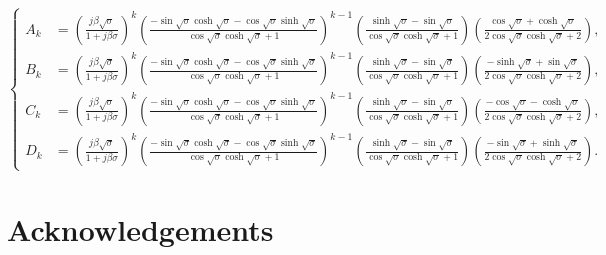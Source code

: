 \documentclass{article}
\begin{document}
\begin{equation*}
    \left\{\begin{aligned}
        A_{k} &= \left( \frac{j \beta \sqrt{\sigma }}{1+j \beta \sigma } \right)^{k} \left( \frac{ -\sin\sqrt{\sigma} \cosh\sqrt{\sigma} - \cos\sqrt{\sigma} \sinh\sqrt{\sigma} }{ \cos\sqrt{\sigma }\cosh\sqrt{\sigma }+1 } \right)^{k-1} \left( \frac{\sinh\sqrt{\sigma }-\sin\sqrt{\sigma }}{\cos\sqrt{\sigma } \cosh\sqrt{\sigma }+1} \right) \left(\frac{\cos\sqrt{\sigma }+\cosh\sqrt{\sigma }}{2 \cos\sqrt{\sigma }\cosh\sqrt{\sigma }+2} \right), \\
        B_{k} &= \left( \frac{j \beta \sqrt{\sigma }}{1+j \beta \sigma } \right)^{k}  \left( \frac{ -\sin\sqrt{\sigma} \cosh\sqrt{\sigma} - \cos\sqrt{\sigma} \sinh\sqrt{\sigma} }{ \cos\sqrt{\sigma }\cosh\sqrt{\sigma }+1 } \right)^{k-1} \left( \frac{\sinh\sqrt{\sigma }-\sin\sqrt{\sigma }}{\cos\sqrt{\sigma } \cosh\sqrt{\sigma }+1} \right) \left( \frac{-\sinh\sqrt{\sigma }+\sin\sqrt{\sigma }}{2 \cos\sqrt{\sigma }\cosh\sqrt{\sigma }+2} \right), \\
        C_{k} &= \left( \frac{j \beta \sqrt{\sigma }}{1+j \beta \sigma } \right)^{k}  \left( \frac{ -\sin\sqrt{\sigma} \cosh\sqrt{\sigma} - \cos\sqrt{\sigma} \sinh\sqrt{\sigma} }{ \cos\sqrt{\sigma }\cosh\sqrt{\sigma }+1 } \right)^{k-1} \left( \frac{\sinh\sqrt{\sigma }-\sin\sqrt{\sigma }}{\cos\sqrt{\sigma } \cosh\sqrt{\sigma }+1} \right) \left( \frac{-\cos\sqrt{\sigma }-\cosh\sqrt{\sigma }}{2 \cos\sqrt{\sigma } \cosh\sqrt{\sigma }+2} \right), \\
        D_{k} &= \left( \frac{j \beta \sqrt{\sigma }}{1+j \beta \sigma } \right)^{k} \left( \frac{ -\sin\sqrt{\sigma} \cosh\sqrt{\sigma} - \cos\sqrt{\sigma} \sinh\sqrt{\sigma} }{ \cos\sqrt{\sigma }\cosh\sqrt{\sigma }+1 } \right)^{k-1} \left( \frac{\sinh\sqrt{\sigma }-\sin\sqrt{\sigma }}{\cos\sqrt{\sigma } \cosh\sqrt{\sigma }+1} \right) \left( \frac{-\sin\sqrt{\sigma }+\sinh\sqrt{\sigma }}{2 \cos\sqrt{\sigma }\cosh\sqrt{\sigma }+2} \right).
    \end{aligned}\right.
\end{equation*}
\normalsize



\section*{Acknowledgements}




\end{document}
